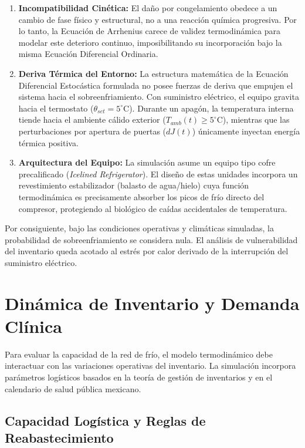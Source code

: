 \documentclass[
  spanish,
  letterpaper,
  DIV=11,
  numbers=noendperiod]{scrreprt}
\providecommand{\tightlist}{%
  \setlength{\itemsep}{0pt}\setlength{\parskip}{0pt}}
\theoremstyle{plain}
\theoremstyle{plain}
\theoremstyle{plain}
\theoremstyle{definition}
\theoremstyle{remark}
\begin{document}
\begin{enumerate}
\def\labelenumi{\arabic{enumi}.}
\tightlist
\item
  \textbf{Incompatibilidad Cinética:} El daño por congelamiento obedece
  a un cambio de fase físico y estructural, no a una reacción química
  progresiva. Por lo tanto, la Ecuación de Arrhenius carece de validez
  termodinámica para modelar este deterioro continuo, imposibilitando su
  incorporación bajo la misma Ecuación Diferencial Ordinaria.
\item
  \textbf{Deriva Térmica del Entorno:} La estructura matemática de la
  Ecuación Diferencial Estocástica formulada no posee fuerzas de deriva
  que empujen el sistema hacia el sobreenfriamiento. Con suministro
  eléctrico, el equipo gravita hacia el termostato
  (\(\theta_{set} = 5^\circ\text{C}\)). Durante un apagón, la
  temperatura interna tiende hacia el ambiente cálido exterior
  (\(T_{amb}(t) \ge 5^\circ\text{C}\)), mientras que las perturbaciones
  por apertura de puertas (\(dJ(t)\)) únicamente inyectan energía
  térmica positiva.
\item
  \textbf{Arquitectura del Equipo:} La simulación asume un equipo tipo
  cofre precalificado (\emph{Icelined Refrigerator}). El diseño de estas
  unidades incorpora un revestimiento estabilizador (balasto de
  agua/hielo) cuya función termodinámica es precisamente absorber los
  picos de frío directo del compresor, protegiendo al biológico de
  caídas accidentales de temperatura.
\end{enumerate}

Por consiguiente, bajo las condiciones operativas y climáticas
simuladas, la probabilidad de sobreenfriamiento se considera nula. El
análisis de vulnerabilidad del inventario queda acotado al estrés por
calor derivado de la interrupción del suministro eléctrico.

\section{Dinámica de Inventario y Demanda
Clínica}\label{sec-dinamica-inventario}

Para evaluar la capacidad de la red de frío, el modelo termodinámico
debe interactuar con las variaciones operativas del inventario. La
simulación incorpora parámetros logísticos basados en la teoría de
gestión de inventarios y en el calendario de salud pública mexicano.

\subsection{Capacidad Logística y Reglas de
Reabastecimiento}\label{capacidad-loguxedstica-y-reglas-de-reabastecimiento}
\end{document}
